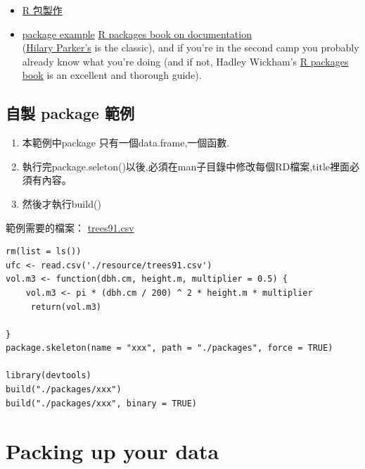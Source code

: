\documentclass[]{book}
\providecommand{\tightlist}{%
  \setlength{\itemsep}{0pt}\setlength{\parskip}{0pt}}
\theoremstyle{definition}
\theoremstyle{definition}
\theoremstyle{definition}
\theoremstyle{remark}
\begin{document}
\begin{itemize}
\tightlist
\item
  \href{https://yulongniu.bionutshell.org/blog/2012/05/30/r-package-and-roxygen2/}{R
  包製作}\\
\item
  \href{https://github.com/kleinschmidt/r-packages/blob/c5e57de0b7ddc7968c8819fa904d00249934c055/tutorial.Rmd}{package
  example} \href{http://r-pkgs.had.co.nz/man.html}{R packages book on
  documentation}\\
  (\href{https://hilaryparker.com/2014/04/29/writing-an-r-package-from-scratch/}{Hilary
  Parker's} is the classic), and if you're in the second camp you
  probably already know what you're doing (and if not, Hadley Wickham's
  \href{http://r-pkgs.had.co.nz/}{R packages book} is an excellent and
  thorough guide).
\end{itemize}

\hypertarget{-package-}{%
\subsection{自製 package 範例}\label{-package-}}

\begin{enumerate}
\def\labelenumi{\arabic{enumi}.}
\tightlist
\item
  本範例中package 只有一個data.frame,一個函數.\\
\item
  執行完package.seleton()以後,必須在man子目錄中修改每個RD檔案,title裡面必須有內容。\\
\item
  然後才執行build()
\end{enumerate}

範例需要的檔案： \href{./resources/trees91.csv}{trees91.csv}

\begin{verbatim}
rm(list = ls())
ufc <- read.csv('./resource/trees91.csv')
vol.m3 <- function(dbh.cm, height.m, multiplier = 0.5) {
    vol.m3 <- pi * (dbh.cm / 200) ^ 2 * height.m * multiplier
     return(vol.m3)
    
}
package.skeleton(name = "xxx", path = "./packages", force = TRUE)

library(devtools)
build("./packages/xxx")
build("./packages/xxx", binary = TRUE)
\end{verbatim}

\hypertarget{packing-up-your-data}{%
\section{Packing up your data}\label{packing-up-your-data}}
\end{document}
